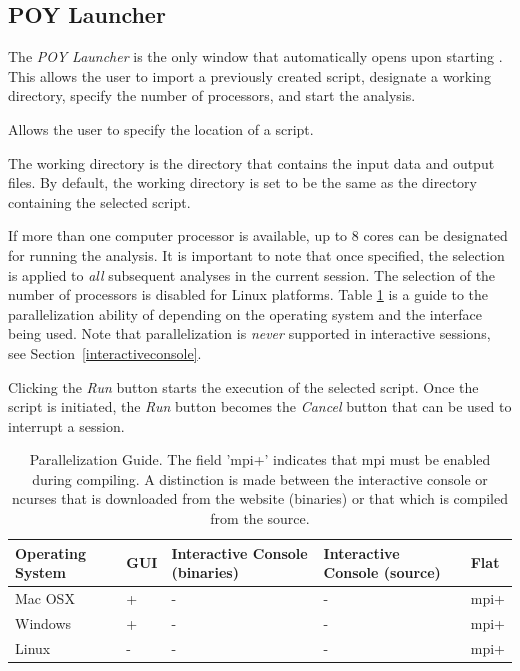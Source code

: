 \subsection{POY Launcher} 
The \emph{POY Launcher} is the only window that automatically opens upon starting \poy. This allows the user to import a previously created script, designate a working directory, specify the number of processors, and start the analysis.

\begin{description}
\setlength{\labelsep}{5pt}
\setlength{\itemindent}{0pt}%
	 \item[Select the script to run]
     Allows the user to specify the location of a \poy script.
	\item[Select the working directory]
    The working directory is the
    directory that contains the input data and output files. By default, the working directory is set to be the same as the
    directory containing the selected \poy script. 
	\item[Select the number of processors]
    If more than one computer processor is available, up to 8 cores can be designated for running the analysis. It is important to note that once specified, the selection is applied to \emph{all} subsequent analyses in the current \poy session. The selection of the number of processors is disabled for Linux platforms. Table \ref{ParallelizationGuide} is a guide to the parallelization ability of \poy depending on the operating system and the \poy interface being used. Note that parallelization is \emph{never} supported in interactive sessions, see Section~\ref{interactiveconsole}.
    	\item[Run the analysis]
    Clicking the \emph{Run} button starts the execution of the selected script. Once the script is initiated, the \emph{Run} button
    becomes the \emph{Cancel} button that can be used to interrupt a \poy session.
\end{description}

\begin{table}[t] 
\small
\caption{Parallelization Guide. The field 'mpi+' indicates that mpi must be enabled during compiling. A distinction is made between the interactive console or ncurses that is downloaded from the website (binaries) or that which is compiled from the source.}
\label{ParallelizationGuide} 
\begin{center}
\renewcommand{\arraystretch}{1.5}
\begin{tabular}{p{3.0cm}  p{1.0cm}  p{2.75cm}  p{2.75cm}  p{1.0cm}} 
\hline
	Operating System & GUI & Interactive Console (binaries) & Interactive Console (source) & Flat \\
\hline
	Mac OSX & + & - & - & mpi+ \\
	Windows & + & - & - & mpi+ \\
	Linux & - & - & - & mpi+ \\
\hline
\end{tabular}
\end{center}
\end{table}

